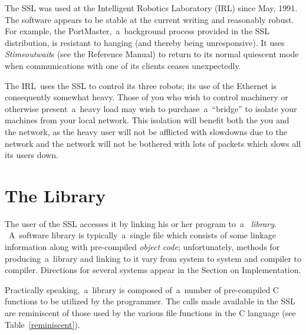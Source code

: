 \documentclass[12pt]{article}
\def\SSL{{\small SSL}}
\def\IRL{{\small IRL}}
\begin{document}
The {\SSL} was used at the
Intelligent Robotics Laboratory (\IRL) since May, 1991.  The software appears
to be stable at the current writing and reasonably robust.  For example, the
PortMaster,~a~background process provided in the {\SSL} distribution, is
resistant to hanging (and thereby being unresponsive). It uses {\em
Stimeoutwait\/}s (see the Reference Manual) to return to its normal quiescent
mode when communications with one of its clients ceases unexpectedly.

The \IRL\ uses the {\SSL} to control its three robots; its use of the Ethernet
is consequently somewhat heavy.  Those of you who wish to control machinery or
otherwise present~a~heavy load may wish to purchase~a~``bridge'' to isolate
your machines from your local network.  This isolation will benefit both the
you and the network, as the heavy user will not be afflicted with slowdowns due
to the network and the network will not be bothered with lots of packets which
slows all its users down.


\newpage
\section{The Library}

The user of the {\SSL} accesses it by linking his or her program to~a~{\em
library}. ~A~software library is typically~a~single file which consists of some
linkage information along with pre-compiled {\em object code}; unfortunately,
methods for producing~a~library and linking to it vary from system to system
and compiler to compiler.  Directions for several systems appear in the Section
on Implementation.

Practically speaking,~a~library is composed of~a~number of pre-compiled C
functions to be utilized by the programmer.  The calls made available in the
{\SSL} are reminiscent of those used by the various file functions in the C
language (see Table~\ref{reminiscent}).
\end{document}
